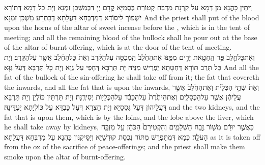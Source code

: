 {וְיִתֵּין כָּהֲנָא מִן דְּמָא עַל קַרְנָת מַדְבַּח קְטוֹרַת בֻּסְמַיָּא קֳדָם יְיָ דִּבְמַשְׁכַּן זִמְנָא וְיָת כָּל דְּמָא דְּתוֹרָא יִשְׁפּוֹךְ לִיסוֹדָא דְּמַדְבְּחָא דַּעֲלָתָא דְּבִתְרַע מַשְׁכַּן זִמְנָא׃}
{And the priest shall put of the blood upon the horns of the altar of sweet incense before the \lord, which is in the tent of meeting; and all the remaining blood of the bullock shall he pour out at the base of the altar of burnt-offering, which is at the door of the tent of meeting.}{}
{וְאֶת\maqqaf כׇּל\maqqaf חֵ֛לֶב פַּ֥ר הַֽחַטָּ֖את יָרִ֣ים מִמֶּ֑נּוּ אֶת\maqqaf הַחֵ֙לֶב֙ הַֽמְכַסֶּ֣ה עַל\maqqaf הַקֶּ֔רֶב וְאֵת֙ כׇּל\maqqaf הַחֵ֔לֶב אֲשֶׁ֖ר עַל\maqqaf הַקֶּֽרֶב׃}
{וְיָת כָּל תְּרַב תּוֹרָא דְּחַטָּתָא יַפְרֵישׁ מִנֵּיהּ יָת תַּרְבָּא דְּחָפֵי עַל גַּוָּא וְיָת כָּל תַּרְבָּא דְּעַל גַּוָּא׃}
{And all the fat of the bullock of the sin-offering he shall take off from it; the fat that covereth the inwards, and all the fat that is upon the inwards,}{}
{וְאֵת֙ שְׁתֵּ֣י הַכְּלָיֹ֔ת וְאֶת\maqqaf הַחֵ֙לֶב֙ אֲשֶׁ֣ר עֲלֵיהֶ֔ן אֲשֶׁ֖ר עַל\maqqaf הַכְּסָלִ֑ים וְאֶת\maqqaf הַיֹּתֶ֙רֶת֙ עַל\maqqaf הַכָּבֵ֔ד עַל\maqqaf הַכְּלָי֖וֹת יְסִירֶֽנָּה׃}
{וְיָת תַּרְתֵּין כּוֹלְיָן וְיָת תַּרְבָּא דַּעֲלֵיהוֹן דְּעַל גִּסְסַיָּא וְיָת חַצְרָא דְּעַל כַּבְדָּא עַל כּוֹלְיָתָא יַעְדֵּינַהּ׃}
{and the two kidneys, and the fat that is upon them, which is by the loins, and the lobe above the liver, which he shall take away by kidneys,}{}
{כַּאֲשֶׁ֣ר יוּרַ֔ם מִשּׁ֖וֹר זֶ֣בַח הַשְּׁלָמִ֑ים וְהִקְטִירָם֙ הַכֹּהֵ֔ן עַ֖ל מִזְבַּ֥ח הָעֹלָֽה׃}
{כְּמָא דְּמִתַּפְרַשׁ מִתּוֹר נִכְסַת קוּדְשַׁיָּא וְיַסֵּיקִנּוּן כָּהֲנָא עַל מַדְבְּחָא דַּעֲלָתָא׃}
{as it is taken off from the ox of the sacrifice of peace-offerings; and the priest shall make them smoke upon the altar of burnt-offering.}{}
